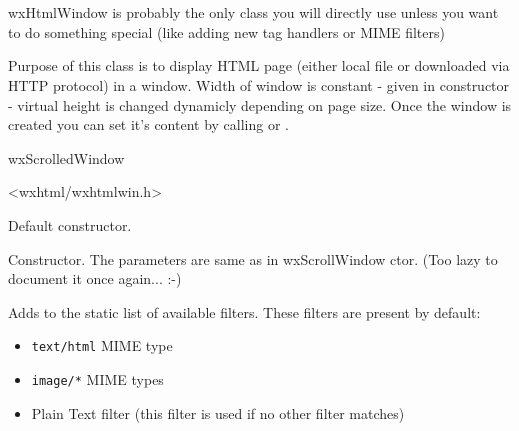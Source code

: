 %
%

\section{}\label{wxhtmlwindow}

wxHtmlWindow is probably the only class you will directly use
unless you want to do something special (like adding new tag
handlers or MIME filters)

Purpose of this class is to display HTML page (either local
file or downloaded via HTTP protocol) in a window. Width
of window is constant - given in constructor - virtual height
is changed dynamicly depending on page size.
Once the window is created you can set it's content by calling
 or 
. 


wxScrolledWindow


<wxhtml/wxhtmlwin.h>

\label{wxhtmlwindowwxhtmlwindow}


Default constructor.


Constructor. The parameters are same as in wxScrollWindow ctor.
(Too lazy to document it once again... :-)



\label{wxhtmlwindowaddfilter}


Adds  to the static list of available
filters. These filters are present by default:

\begin{itemize}
\item {\tt text/html} MIME type
\item {\tt image/*} MIME types
\item Plain Text filter (this filter is used if no other filter matches)
\end{itemize}


